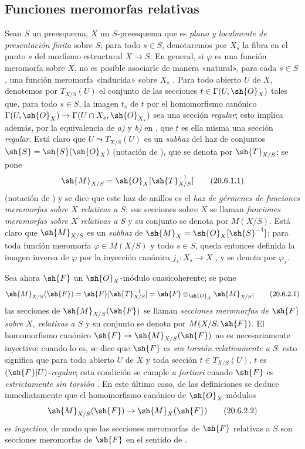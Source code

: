 \subsection{Funciones meromorfas relativas}
\label{IV.20.6}

\begin{env}[20.6.1]
\label{IV.20.6.1}
Sean $S$ un preesquema, $X$ un $S$-preesquema que es \emph{plano y localmente de presentación finita} sobre $S$; para todo $s\in S$, denotaremos por $X_s$ la fibra en el punto $s$ del morfismo estructural $X\to S$.
En general, si $\varphi$ es una función meromorfa sobre $X$, no es posible asociarle de manera «natural», para cada $s\in S$, una función meromorfa «inducida» sobre $X_s$ .
Para todo abierto $U$ de $X$, denotemos por $T_{X/S}(U)$ el conjunto de las secciones $t\in\Gamma(U,\sh{O}_X)$ tales que, para todo $s\in S$, la imagen $t_s$ de $t$ por el homomorfismo canónico $\Gamma(U,\sh{O}_X)\to\Gamma(U\cap X_s,\sh{O}_{X_s})$ sea una sección \emph{regular}; esto implica además, por la equivalencia de \emph{a)} y \emph{b)} en , que $t$ es ella misma una sección \emph{regular}.
Está claro que $U\leadsto T_{X/S}(U)$ es un \emph{subhaz} del haz de conjuntos $\sh{S}=\sh{S}(\sh{O}_X)$ (notación de ), que se denota por $\sh{T}_{X/S}$; se pone
\[
\label{IV.20.6.1.1}
  \sh{M}_{X/S}=\sh{O}_X[\sh{T}_{X/S}^{-1}]
  \tag{20.6.1.1}
\]
(notación de ) y se dice que este haz de anillos es el \emph{haz de gérmenes de funciones meromorfas sobre $X$ relativas a $S$}; sus secciones sobre $X$ se llaman \emph{funciones meromorfas sobre $X$ relativas a $S$} y su conjunto se denota por $M(X/S)$.
Está claro que $\sh{M}_{X/S}$ es un \emph{subhaz} de $\sh{M}_X=\sh{O}_X[\sh{S}^{-1}]$; para toda función meromorfa $\varphi\in M(X/S)$ y todo $s\in S$, queda entonces definida la imagen inversa de $\varphi$ por la inyección canónica $j_s:X_s\to X$ , y se denota por $\varphi_s$.
\end{env}

\begin{env}[20.6.2]
\label{IV.20.6.2}
Sea ahora $\sh{F}$ un $\sh{O}_X$-módulo cuasicoherente; se pone
\[
\label{IV.20.6.2.1}
  \sh{M}_{X/S}(\sh{F})=\sh{F}[\sh{T}_{X/S}^{-1}]=\sh{F}\otimes_{\sh{O}_X}\sh{M}_{X/S};
  \tag{20.6.2.1}
\]
las secciones de $\sh{M}_{X/S}(\sh{F})$ se llaman \emph{secciones meromorfas de $\sh{F}$ sobre $X$, relativas a $S$} y su conjunto se denota por $M(X/S,\sh{F})$.
El homomorfismo canónico $\sh{F}\to\sh{M}_{X/S}(\sh{F})$ no es necesariamente inyectivo; cuando lo es, se dice que $\sh{F}$ es \emph{sin torsión relativamente a $S$}: esto significa que para todo abierto $U$ de $X$ y toda sección $t\in T_{X/S}(U)$, $t$ es $(\sh{F}|U)$-\emph{regular}; esta condición se cumple \emph{a fortiori} cuando $\sh{F}$ es \emph{estrictamente sin torsión} .
En este último caso, de las definiciones  se deduce inmediatamente que el homomorfismo canónico de $\sh{O}_X$-módulos
\[
\label{IV.20.6.2.2}
  \sh{M}_{X/S}(\sh{F})\to\sh{M}_X(\sh{F})
  \tag{20.6.2.2}
\]
es \emph{inyectivo}, de modo que las secciones meromorfas de $\sh{F}$ relativas a $S$ son secciones meromorfas de $\sh{F}$ en el sentido de .
\end{env}

